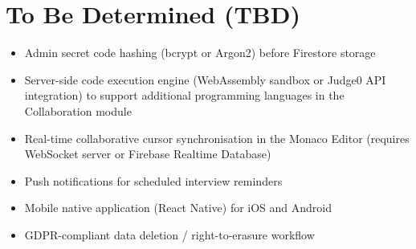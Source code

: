 \documentclass{fisatinternship}
\begin{document}
\section{To Be Determined (TBD)}
\begin{itemize}
  \item Admin secret code hashing (bcrypt or Argon2) before Firestore storage
  \item Server-side code execution engine (WebAssembly sandbox or Judge0 API integration)
        to support additional programming languages in the Collaboration module
  \item Real-time collaborative cursor synchronisation in the Monaco Editor
        (requires WebSocket server or Firebase Realtime Database)
  \item Push notifications for scheduled interview reminders
  \item Mobile native application (React Native) for iOS and Android
  \item GDPR-compliant data deletion / right-to-erasure workflow
\end{itemize}
\end{document}
